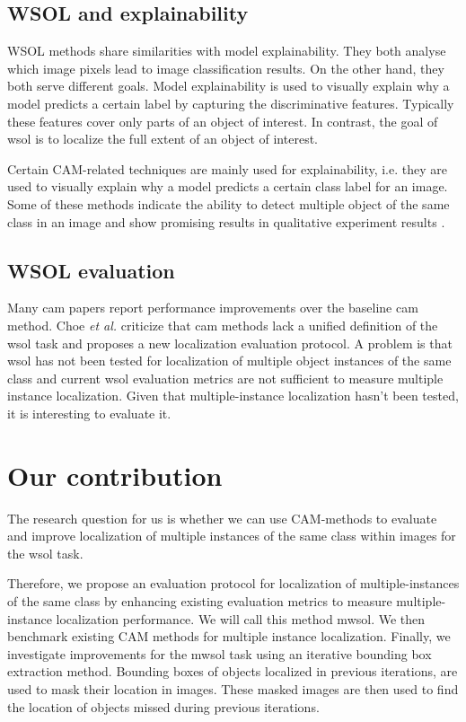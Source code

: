 \subsection{WSOL and explainability}
WSOL methods share similarities with model explainability. They both analyse which image pixels lead to image classification results. On the other hand, they both serve different goals.
Model explainability is used to visually explain why a model predicts a certain label by capturing the discriminative features. Typically these features cover only parts of an object of interest. In contrast, the goal of \acrshort{wsol} is to localize the full extent of an object of interest.

Certain CAM-related techniques are mainly used for explainability, i.e. they are used to visually explain why a model predicts a certain class label for an image. Some of these methods indicate the ability to detect multiple object of the same class in an image and show promising results in qualitative experiment results \cite{wang2020score}.

\subsection{WSOL evaluation}
Many \acrshort{cam} papers report performance improvements over the baseline \acrshort{cam} method. Choe \textit{et al.} \cite{choe2020evaluating} criticize that \acrshort{cam} methods lack a unified definition of the \acrshort{wsol} task and proposes a new localization evaluation protocol. A problem is that \acrshort{wsol} has not been tested for localization of multiple object instances of the same class and current \acrshort{wsol} evaluation metrics are not sufficient to measure multiple instance localization. Given that multiple-instance localization hasn't been tested, it is interesting to evaluate it. 

\section{Our contribution}
The research question for us is whether we can use CAM-methods to evaluate and improve localization of multiple instances of the same class within images for the \acrshort{wsol} task.

Therefore, we propose an evaluation protocol for localization of multiple-instances of the same class by enhancing existing evaluation metrics \cite{choe2020evaluating} to measure multiple-instance localization performance. We will call this method \acrfull{mwsol}. We then benchmark existing CAM methods for multiple instance localization. Finally, we investigate improvements for the \acrshort{mwsol} task using an iterative bounding box extraction method. Bounding boxes of objects localized in previous iterations, are used to mask their location in images. These masked images are then used to find the location of objects missed during previous iterations.

